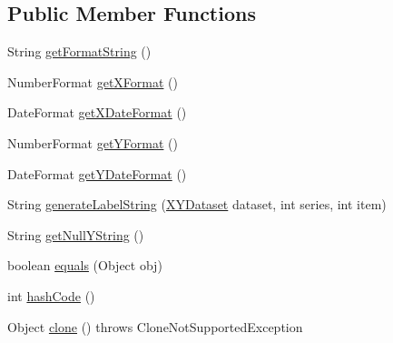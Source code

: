 \subsection*{Public Member Functions}
\begin{DoxyCompactItemize}
\item 
String \mbox{\hyperlink{classorg_1_1jfree_1_1chart_1_1labels_1_1_abstract_x_y_item_label_generator_a3ba0759dfe410dfc9f1b59ba6477103b}{get\+Format\+String}} ()
\item 
Number\+Format \mbox{\hyperlink{classorg_1_1jfree_1_1chart_1_1labels_1_1_abstract_x_y_item_label_generator_a26fc94876787d5ad0361f579c175c079}{get\+X\+Format}} ()
\item 
Date\+Format \mbox{\hyperlink{classorg_1_1jfree_1_1chart_1_1labels_1_1_abstract_x_y_item_label_generator_abfa0d1dc5d5efa46a9d66ed06ee3e2e4}{get\+X\+Date\+Format}} ()
\item 
Number\+Format \mbox{\hyperlink{classorg_1_1jfree_1_1chart_1_1labels_1_1_abstract_x_y_item_label_generator_ab308bc28bbe7a016bd2eb050dfadac5c}{get\+Y\+Format}} ()
\item 
Date\+Format \mbox{\hyperlink{classorg_1_1jfree_1_1chart_1_1labels_1_1_abstract_x_y_item_label_generator_a94a14a3cb58a85ba77a32bb9ff84c61c}{get\+Y\+Date\+Format}} ()
\item 
String \mbox{\hyperlink{classorg_1_1jfree_1_1chart_1_1labels_1_1_abstract_x_y_item_label_generator_ab367bbb1b9872f4b0438d92956369103}{generate\+Label\+String}} (\mbox{\hyperlink{interfaceorg_1_1jfree_1_1data_1_1xy_1_1_x_y_dataset}{X\+Y\+Dataset}} dataset, int series, int item)
\item 
String \mbox{\hyperlink{classorg_1_1jfree_1_1chart_1_1labels_1_1_abstract_x_y_item_label_generator_a736e9874d3d43c91d054a0c4e6422832}{get\+Null\+Y\+String}} ()
\item 
boolean \mbox{\hyperlink{classorg_1_1jfree_1_1chart_1_1labels_1_1_abstract_x_y_item_label_generator_aae23f262c565b3a9c0a90d6221f9908b}{equals}} (Object obj)
\item 
int \mbox{\hyperlink{classorg_1_1jfree_1_1chart_1_1labels_1_1_abstract_x_y_item_label_generator_ab83b43842c2df2cb57cd84d75a64793a}{hash\+Code}} ()
\item 
Object \mbox{\hyperlink{classorg_1_1jfree_1_1chart_1_1labels_1_1_abstract_x_y_item_label_generator_a888c63024475364f8bb4b09b42e986fd}{clone}} ()  throws Clone\+Not\+Supported\+Exception 
\end{DoxyCompactItemize}
